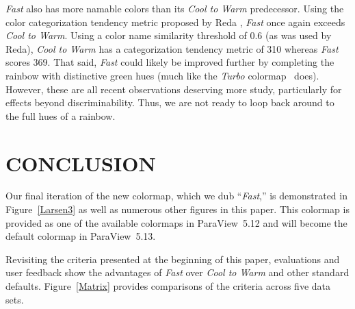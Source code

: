\documentclass{IEEEcsmag}
\newcommand*{\colormap}[1]{\textsl{#1}\xspace}
\newcommand*{\coolwarm}{\colormap{Cool to Warm}}
\newcommand*{\fast}{\colormap{Fast}}
\newcommand*{\turbo}{\colormap{Turbo}}
\begin{document}
\fast also has more namable colors than its \coolwarm predecessor.
Using the color categorization tendency metric proposed by Reda \cite{Reda2022}, \fast once again exceeds \coolwarm.
Using a color name similarity threshold of 0.6 (as was used by Reda), \coolwarm has a categorization tendency metric of 310 whereas \fast scores 369.
That said, \fast could likely be improved further by completing the rainbow with distinctive green hues (much like the \turbo colormap~\cite{Mikhailov2019} does).
However, these are all recent observations deserving more study, particularly for effects beyond discriminability.
Thus, we are not ready to loop back around to the full hues of a rainbow.


\section{CONCLUSION}

Our final iteration of the new colormap, which we dub ``\fast,'' is demonstrated in Figure~\ref{Larsen3} as well as numerous other figures in this paper.
This colormap is provided as one of the available colormaps in ParaView~5.12 and will become the default colormap in ParaView~5.13.

Revisiting the criteria presented at the beginning of this paper, evaluations and user feedback show the advantages of \fast over \coolwarm and other standard defaults. Figure~\ref{Matrix} provides comparisons of the criteria across five data sets.


\end{document}
